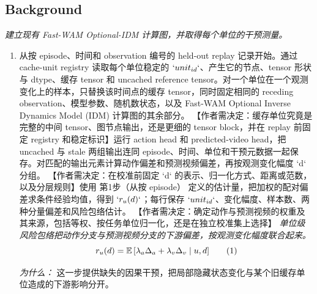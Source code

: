 \documentclass[10pt,a4paper]{article}
\begin{document}
\subsection*{Background}
\emph{建立现有 Fast-WAM Optional-IDM 计算图，并取得每个单位的干预测量。}
\begin{enumerate}[leftmargin=*,start=1]
  \item 从按 episode、时间和 observation 编号的 held-out replay 记录开始。通过 cache-unit registry 读取每个单位稳定的 \(`unit_{id}`\)、产生它的节点、tensor 形状与 dtype、缓存 tensor 和 uncached reference tensor。对一个单位在一个观测变化上的样本，只替换该时间点的缓存 tensor，同时固定相同的 receding observation、模型参数、随机数状态，以及 Fast-WAM Optional Inverse Dynamics Model (IDM) 计算图的其余部分。 【作者需决定：缓存单位究竟是完整的中间 tensor、图节点输出，还是更细的 tensor block，并在 replay 前固定 registry 和稳定标识】运行 action head 和 predicted-video head，把 uncached 与 stale 两组输出连同 episode、时间、单位和干预元数据一起保存。对匹配的输出元素计算动作偏差和预测视频偏差，再按观测变化幅度 `d` 分组。 【作者需决定：在校准前固定 `d` 的表示、归一化方式、距离或范数，以及分层规则】使用 第1步（从按 episode） 定义的估计量，把加权的配对偏差求条件经验均值，得到 \(`r_{u}(d)`\)；每行保存 \(`unit_{id}`\)、变化幅度、样本数、两种分量偏差和风险包络估计。 【作者需决定：确定动作与预测视频的权重及其来源，包括等权、按任务单位归一化，还是在独立校准集上选择】
\noindent\emph{单位级风险包络把动作分支与预测视频分支的下游偏差，按观测变化幅度联合起来。}
\begin{equation}
\resizebox{\ifdim\width>\linewidth \linewidth\else\width\fi}{!}{$\displaystyle r_u(d)=\mathbb{E}\left[\lambda_a\Delta_a+\lambda_v\Delta_v\mid u,d\right]$} \tag{1}
\end{equation}
\par\emph{为什么：} 这一步提供缺失的因果干预，把局部隐藏状态变化与某个旧缓存单位造成的下游影响分开。
\end{enumerate}
\end{document}
